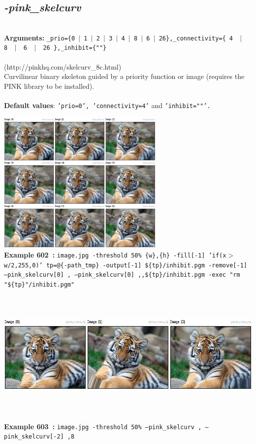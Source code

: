 \documentclass[a4paper,11pt,twoside]{book}
\begin{document}
\subsection{\emph{-pink\_skelcurv} }\vspace*{-0.5em}
~\\\textbf{Arguments: } 
{\small \texttt{\_prio=\{0~$|$~1~$|$~2~$|$~3~$|$~4~$|$~8~$|$~6~$|$~26\},\_connectivity=\{ 4 ~$|$~ 8 ~$|$~ 6 ~$|$~ 26 \},\_inhibit=\{""\}}}\\~\\
(http://pinkhq.com/skelcurv\_8c.html)
~\\Curvilinear binary skeleton guided by a priority function or image (requires the PINK library to be installed).
~\\~\\\textbf{Default values}: {\small \texttt{'prio=0', 'connectivity=4'} and \texttt{'inhibit=""'.}}
\begin{center}\includegraphics[keepaspectratio=true,height=7cm,width=\textwidth]{img/gmic_def602.jpg}\\
{\footnotesize \textbf{Example 602~:} \texttt{image.jpg -threshold 50\% \{w\},\{h\} -fill[-1] 'if(x$>$w/2,255,0)' tp=@\{-path\_tmp\} -output[-1] \$\{tp\}/inhibit.pgm -remove[-1] --pink\_skelcurv[0] , --pink\_skelcurv[0] ,,\$\{tp\}/inhibit.pgm -exec "rm "\$\{tp\}"/inhibit.pgm"}}
\\\includegraphics[keepaspectratio=true,height=7cm,width=\textwidth]{img/gmic_def603.jpg}\\
{\footnotesize \textbf{Example 603~:} \texttt{image.jpg -threshold 50\% --pink\_skelcurv , --pink\_skelcurv[-2] ,8}}
\end{center}
\end{document}
